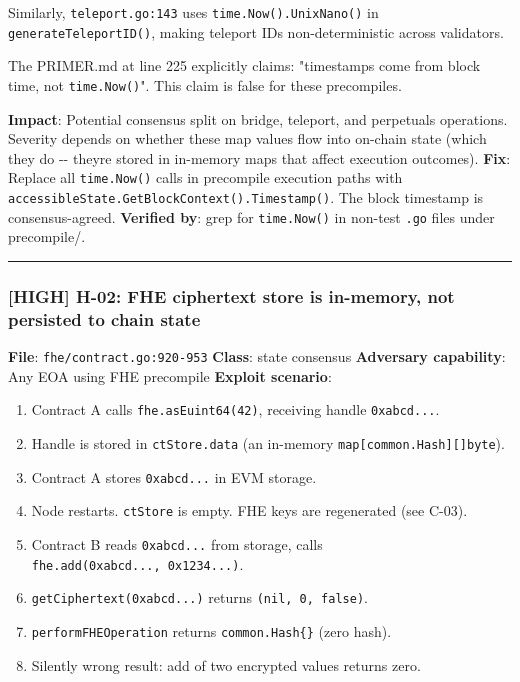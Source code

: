 \documentclass[
]{article}
\providecommand{\tightlist}{%
  \setlength{\itemsep}{0pt}\setlength{\parskip}{0pt}}
\begin{document}
Similarly, \texttt{teleport.go:143} uses \texttt{time.Now().UnixNano()}
in \texttt{generateTeleportID()}, making teleport IDs non-deterministic
across validators.

The PRIMER.md at line 225 explicitly claims: "timestamps come from block
time, not \texttt{time.Now()}". This claim is false for these
precompiles.

\textbf{Impact}: Potential consensus split on bridge, teleport, and
perpetuals operations. Severity depends on whether these map values flow
into on-chain state (which they do -\/- they\textquotesingle re stored
in in-memory maps that affect execution outcomes). \textbf{Fix}: Replace
all \texttt{time.Now()} calls in precompile execution paths with
\texttt{accessibleState.GetBlockContext().Timestamp()}. The block
timestamp is consensus-agreed. \textbf{Verified by}: grep for
\texttt{time.Now()} in non-test \texttt{.go} files under precompile/.

\begin{center}\rule{0.5\linewidth}{0.5pt}\end{center}

\subsubsection{{[}HIGH{]} H-02: FHE ciphertext store is in-memory, not
persisted to chain
state}\label{high-h-02-fhe-ciphertext-store-is-in-memory-not-persisted-to-chain-state}

\textbf{File}: \texttt{fhe/contract.go:920-953} \textbf{Class}: state
\textbar{} consensus \textbf{Adversary capability}: Any EOA using FHE
precompile \textbf{Exploit scenario}:

\begin{enumerate}
\def\labelenumi{\arabic{enumi}.}
\tightlist
\item
  Contract A calls \texttt{fhe.asEuint64(42)}, receiving handle
  \texttt{0xabcd...}.
\item
  Handle is stored in \texttt{ctStore.data} (an in-memory
  \texttt{map{[}common.Hash{]}{[}{]}byte}).
\item
  Contract A stores \texttt{0xabcd...} in EVM storage.
\item
  Node restarts. \texttt{ctStore} is empty. FHE keys are regenerated
  (see C-03).
\item
  Contract B reads \texttt{0xabcd...} from storage, calls
  \texttt{fhe.add(0xabcd...,\ 0x1234...)}.
\item
  \texttt{getCiphertext(0xabcd...)} returns \texttt{(nil,\ 0,\ false)}.
\item
  \texttt{performFHEOperation} returns \texttt{common.Hash\{\}} (zero
  hash).
\item
  Silently wrong result: add of two encrypted values returns zero.
\end{enumerate}
\end{document}
